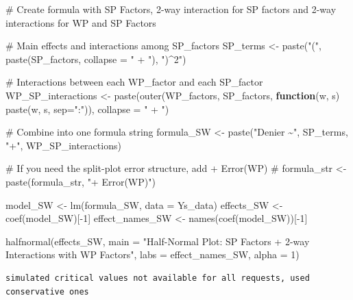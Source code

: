 \documentclass[
  letterpaper,
  DIV=11,
  numbers=noendperiod]{scrartcl}
\newenvironment{Shaded}{\begin{snugshade}}{\end{snugshade}}
\newcommand{\AttributeTok}[1]{\textcolor[rgb]{0.40,0.45,0.13}{#1}}
\newcommand{\CommentTok}[1]{\textcolor[rgb]{0.37,0.37,0.37}{#1}}
\newcommand{\ControlFlowTok}[1]{\textcolor[rgb]{0.00,0.23,0.31}{\textbf{#1}}}
\newcommand{\DecValTok}[1]{\textcolor[rgb]{0.68,0.00,0.00}{#1}}
\newcommand{\FunctionTok}[1]{\textcolor[rgb]{0.28,0.35,0.67}{#1}}
\newcommand{\NormalTok}[1]{\textcolor[rgb]{0.00,0.23,0.31}{#1}}
\newcommand{\OtherTok}[1]{\textcolor[rgb]{0.00,0.23,0.31}{#1}}
\newcommand{\SpecialCharTok}[1]{\textcolor[rgb]{0.37,0.37,0.37}{#1}}
\newcommand{\StringTok}[1]{\textcolor[rgb]{0.13,0.47,0.30}{#1}}
\begin{document}
\begin{Shaded}
\begin{Highlighting}[]
\CommentTok{\# Create formula with SP Factors, 2{-}way interaction for SP factors and 2{-}way interactions for WP and SP Factors}

\CommentTok{\# Main effects and interactions among SP\_factors}
\NormalTok{SP\_terms }\OtherTok{\textless{}{-}} \FunctionTok{paste}\NormalTok{(}\StringTok{"("}\NormalTok{, }\FunctionTok{paste}\NormalTok{(SP\_factors, }\AttributeTok{collapse =} \StringTok{" + "}\NormalTok{), }\StringTok{")\^{}2"}\NormalTok{)}

\CommentTok{\# Interactions between each WP\_factor and each SP\_factor}
\NormalTok{WP\_SP\_interactions }\OtherTok{\textless{}{-}} \FunctionTok{paste}\NormalTok{(}\FunctionTok{outer}\NormalTok{(WP\_factors, SP\_factors, }\ControlFlowTok{function}\NormalTok{(w, s) }\FunctionTok{paste}\NormalTok{(w, s, }\AttributeTok{sep=}\StringTok{":"}\NormalTok{)), }\AttributeTok{collapse =} \StringTok{" + "}\NormalTok{)}

\CommentTok{\# Combine into one formula string}
\NormalTok{formula\_SW }\OtherTok{\textless{}{-}} \FunctionTok{paste}\NormalTok{(}\StringTok{"Denier \textasciitilde{}"}\NormalTok{, SP\_terms, }\StringTok{"+"}\NormalTok{, WP\_SP\_interactions)}

\CommentTok{\# If you need the split{-}plot error structure, add + Error(WP)}
\CommentTok{\# formula\_str \textless{}{-} paste(formula\_str, "+ Error(WP)")}


\NormalTok{model\_SW }\OtherTok{\textless{}{-}} \FunctionTok{lm}\NormalTok{(formula\_SW, }\AttributeTok{data =}\NormalTok{ Ys\_data)}
\NormalTok{effects\_SW }\OtherTok{\textless{}{-}} \FunctionTok{coef}\NormalTok{(model\_SW)[}\SpecialCharTok{{-}}\DecValTok{1}\NormalTok{]}
\NormalTok{effect\_names\_SW }\OtherTok{\textless{}{-}} \FunctionTok{names}\NormalTok{(}\FunctionTok{coef}\NormalTok{(model\_SW))[}\SpecialCharTok{{-}}\DecValTok{1}\NormalTok{]}

\FunctionTok{halfnormal}\NormalTok{(effects\_SW, }\AttributeTok{main =} \StringTok{"Half{-}Normal Plot: SP Factors + 2{-}way Interactions with WP Factors"}\NormalTok{, }
           \AttributeTok{labs =}\NormalTok{ effect\_names\_SW, }\AttributeTok{alpha =} \DecValTok{1}\NormalTok{)}
\end{Highlighting}
\end{Shaded}

\begin{verbatim}
simulated critical values not available for all requests, used conservative ones
\end{verbatim}
\end{document}
